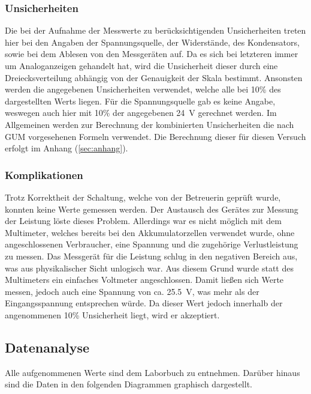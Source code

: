 \subsubsection{Unsicherheiten}

Die bei der Aufnahme der Messwerte zu berücksichtigenden Unsicherheiten treten hier bei den Angaben der Spannungsquelle, der Widerstände, des Kondensators, sowie bei dem Ablesen von den Messgeräten auf. 
Da es sich bei letzteren immer um Analoganzeigen gehandelt hat, wird die Unsicherheit dieser durch eine Dreiecksverteilung abhängig von der Genauigkeit der Skala bestimmt. 
Ansonsten werden die angegebenen Unsicherheiten verwendet, welche alle bei 10\% des dargestellten Werts liegen. Für die Spannungsquelle gab es keine Angabe, weswegen auch hier mit 10\% der angegebenen \SI{24}{\V} gerechnet werden.
Im Allgemeinen werden zur Berechnung der kombinierten Unsicherheiten die nach GUM vorgesehenen Formeln verwendet. 
Die Berechnung dieser für diesen Versuch erfolgt im Anhang (\ref*{sec:anhang}).

\subsubsection{Komplikationen}

Trotz Korrektheit der Schaltung, welche von der Betreuerin geprüft wurde, konnten keine Werte gemessen werden. 
Der Austausch des Gerätes zur Messung der Leistung löste dieses Problem.
Allerdings war es nicht möglich mit dem Multimeter, welches bereits bei den Akkumulatorzellen verwendet wurde, ohne angeschlossenen Verbraucher, eine Spannung und die zugehörige Verlustleistung zu messen.
Das Messgerät für die Leistung schlug in den negativen Bereich aus, was aus physikalischer Sicht unlogisch war.
Aus diesem Grund wurde statt des Multimeters ein einfaches Voltmeter angeschlossen.
Damit ließen sich Werte messen, jedoch auch eine Spannung von ca. \SI{25,5}{\V}, was mehr als der Eingangsspannung entsprechen würde. Da dieser Wert jedoch innerhalb der angenommenen 10\% Unsicherheit liegt, wird er akzeptiert.

\subsection{Datenanalyse}

Alle aufgenommenen Werte sind dem Laborbuch zu entnehmen. 
Darüber hinaus sind die Daten in den folgenden Diagrammen graphisch dargestellt.



